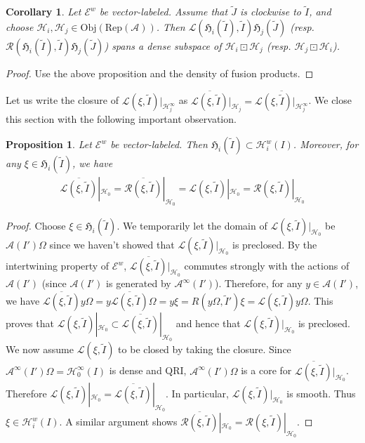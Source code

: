 \documentclass[12pt,a4paper]{article}
\theoremstyle{definition}
\theoremstyle{plain}
\newtheorem{pp}[df]{Proposition}
\newtheorem{co}[df]{Corollary}
\newcommand{\fk}{\mathfrak}
\newcommand{\mc}{\mathcal}
\newcommand{\wtd}{\widetilde}
\newcommand{\ovl}{\overline}
\newcommand{\scr}{\mathscr}
\newcommand{\RepA}{\mathrm{Rep}(\mc A)}
\newcommand{\Obj}{\mathrm{Obj}}
\numberwithin{equation}{subsection}
\begin{document}
\begin{co}\label{lb22}
Let $\scr E^w$ be vector-labeled. Assume that $\wtd J$ is clockwise to $\wtd I$, and choose $\mc H_i,\mc H_j\in\Obj(\RepA)$. Then  $\mc L(\fk H_i(\wtd I),\wtd I)\fk H_j(\wtd J)$ (resp. $\mc R(\fk H_i(\wtd I),\wtd I)\fk H_j(\wtd J)$) spans a dense subspace of $\mc H_i\boxdot\mc H_j$ (resp. $\mc H_j\boxdot\mc H_i$).
\end{co}
\begin{proof}
Use the above proposition and the density of fusion products.
\end{proof}

Let us write the closure of $\scr L(\xi,\wtd I)|_{\mc H_j^\infty}$ as $\ovl{\scr L(\xi,\wtd I)}|_{\mc H_j}=\ovl{\scr L(\xi,\wtd I)|_{\mc H_j^\infty}}$.  We close this section with the following important observation.

\begin{pp}\label{lb27}
Let $\scr E^w$ be vector-labeled. Then $\fk H_i(\wtd I)\subset\mc H_i^w(I)$. Moreover, for any $\xi\in\fk H_i(\wtd I)$, we have
\begin{align}
\ovl{\mc L(\xi,\wtd I)}|_{\mc H_0}=\ovl{\mc R(\xi,\wtd I)}|_{\mc H_0}=\scr L(\xi,\wtd I)|_{\mc H_0}=\scr R(\xi,\wtd I)|_{\mc H_0}\label{eq25}
\end{align}
\end{pp}

\begin{proof}
Choose $\xi\in\fk H_i(\wtd I)$. We temporarily let the domain of $\scr L(\xi,\wtd I)|_{\mc H_0}$ be $\mc A(I')\Omega$ since we haven't showed that $\scr L(\xi,\wtd I)|_{\mc H_0}$ is preclosed. By the intertwining property of $\scr E^w$, $\ovl{\mc L(\xi,\wtd I)}|_{\mc H_0}$ commutes strongly with the actions of $\mc A(I')$ (since $\mc A(I')$ is generated by $\mc A^\infty(I')$). Therefore, for any $y\in\mc A(I')$, we have $\ovl{\mc L(\xi,\wtd I)}y\Omega=y\ovl{\mc L(\xi,\wtd I)}\Omega=y\xi=R(y\Omega,\wtd I')\xi=\scr L(\xi,\wtd I)y\Omega$. This proves that $\scr L(\xi,\wtd I)|_{\mc H_0}\subset\ovl{\mc L(\xi,\wtd I)}|_{\mc H_0}$ and hence that $\scr L(\xi,\wtd I)|_{\mc H_0}$ is preclosed. We now assume $\scr L(\xi,\wtd I)$ to be closed by taking the closure. Since $\mc A^\infty(I')\Omega=\mc H_0^\infty(I)$ is dense and QRI, $\mc A^\infty(I')\Omega$ is a core for $\ovl{\mc L(\xi,\wtd I)}|_{\mc H_0}$. Therefore $\scr L(\xi,\wtd I)|_{\mc H_0}=\ovl{\mc L(\xi,\wtd I)}|_{\mc H_0}$. In particular, $\scr L(\xi,\wtd I)|_{\mc H_0}$ is smooth. Thus $\xi\in\mc H_i^w(I)$. A similar argument shows $\ovl{\mc R(\xi,\wtd I)}|_{\mc H_0}=\scr R(\xi,\wtd I)|_{\mc H_0}$.
\end{proof}
\end{document}
